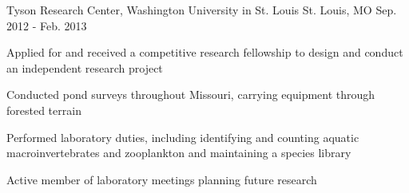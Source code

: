 \begin{cventries}
    {Tyson Research Center, Washington University in St. Louis} %
    {St. Louis, MO} %
    {Sep. 2012 - Feb. 2013} %
    {
      \begin{cvitems} %
        \item {Applied for and received a competitive research fellowship to design and conduct an independent research project}
        \item {Conducted pond surveys throughout Missouri, carrying equipment through forested terrain}
        \item {Performed laboratory duties, including identifying and counting aquatic macroinvertebrates and zooplankton and maintaining a species library}
        \item {Active member of laboratory meetings planning future research}
      \end{cvitems}
    }

\end{cventries}
